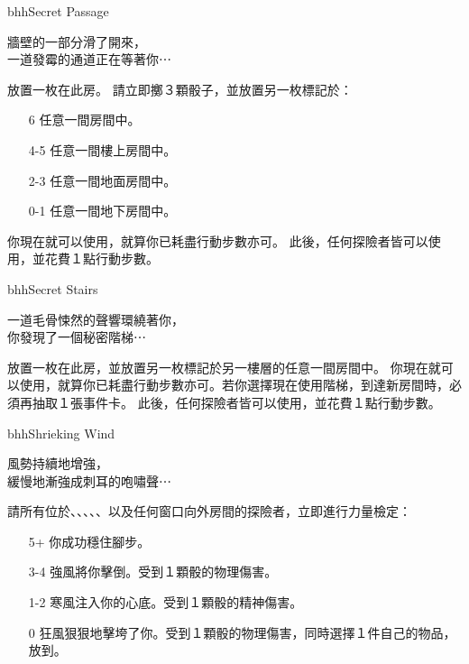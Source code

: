 \linebreak[0]%
\begin{EventCard}{bhh}{Secret Passage}
  \begin{CardStory}
    牆壁的一部分滑了開來，\\
    一道發霉的通道正在等著你⋯
  \end{CardStory}
  放置一枚在此房。\smallbreak
  請立即擲３顆骰子，並放置另一枚標記於：
  \begin{itemize}
    \item[6] 任意一間房間中。
    \item[4-5] 任意一間樓上房間中。
    \item[2-3] 任意一間地面房間中。
    \item[0-1] 任意一間地下房間中。
  \end{itemize}
  你現在就可以使用，就算你已耗盡行動步數亦可。\smallbreak
  此後，任何探險者皆可以使用，並花費１點行動步數。\smallbreak
\end{EventCard}%
\linebreak[0]%
\begin{EventCard}{bhh}{Secret Stairs}
  \begin{CardStory}
    一道毛骨悚然的聲響環繞著你，\\
    你發現了一個秘密階梯⋯
  \end{CardStory}
  放置一枚在此房，並放置另一枚標記於另一樓層的任意一間房間中。\smallbreak
  你現在就可以使用，就算你已耗盡行動步數亦可。若你選擇現在使用階梯，到達新房間時，必須再抽取１張事件卡。\smallbreak
  此後，任何探險者皆可以使用，並花費１點行動步數。\smallbreak
\end{EventCard}%
\linebreak[0]%
\begin{EventCard}{bhh}{Shrieking Wind}
  \begin{CardStory}
    風勢持續地增強，\\
    緩慢地漸強成刺耳的咆嘯聲⋯
  \end{CardStory}
  請所有位於、、、、、以及任何窗口向外房間的探險者，立即進行力量檢定：
  \begin{itemize}
    \item[5+] 你成功穩住腳步。
    \item[3-4] 強風將你擊倒。受到１顆骰的物理傷害。
    \item[1-2] 寒風注入你的心底。受到１顆骰的精神傷害。
    \item[0] 狂風狠狠地擊垮了你。受到１顆骰的物理傷害，同時選擇１件自己的物品，放到。
  \end{itemize}
\end{EventCard}%
